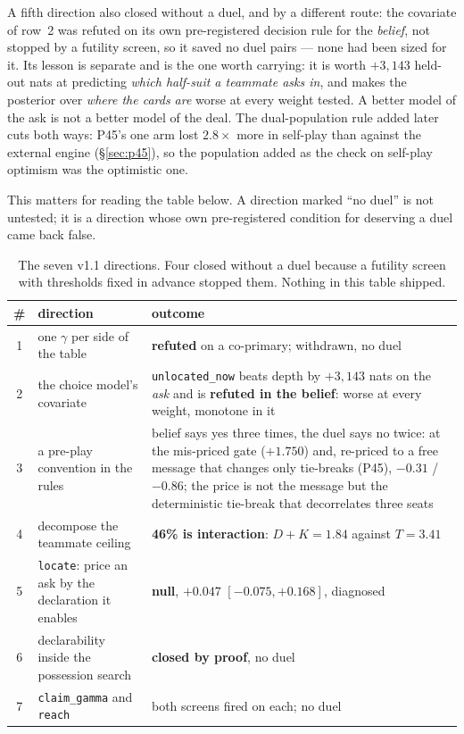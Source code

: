 \documentclass[11pt,letterpaper]{article}
\begin{document}
A fifth direction also closed without a duel, and by a different route: the
covariate of row~2 was refuted on its own pre-registered decision rule for the
\emph{belief}, not stopped by a futility screen, so it saved no duel pairs ---
none had been sized for it. Its lesson is separate and is the one worth
carrying: it is worth $+3{,}143$ held-out nats at predicting \emph{which
half-suit a teammate asks in}, and makes the posterior over \emph{where the
cards are} worse at every weight tested. A better model of the ask is not a
better model of the deal. The dual-population rule added later cuts both ways:
P45's one arm lost $2.8\times$ more in self-play than against the external engine
(\S\ref{sec:p45}), so the population added as the check on self-play optimism
was the optimistic one.

This matters for reading the table below. A direction marked ``no duel'' is not
untested; it is a direction whose own pre-registered condition for deserving a
duel came back false.

\begin{table}[htbp]
\centering\small
\begin{tabular}{@{}clp{7.2cm}@{}}
\toprule
\# & direction & outcome \\
\midrule
1 & one $\gamma$ per side of the table & \textbf{refuted} on a co-primary; withdrawn, no duel \\
2 & the choice model's covariate & \texttt{unlocated\_now} beats depth by $+3{,}143$ nats on the \emph{ask} and is \textbf{refuted in the belief}: worse at every weight, monotone in it \\
3 & a pre-play convention in the rules & belief says yes three times, the duel says no twice: at the mis-priced gate ($+1.750$) and, re-priced to a free message that changes only tie-breaks (P45), $-0.31$ / $-0.86$; the price is not the message but the deterministic tie-break that decorrelates three seats \\
4 & decompose the teammate ceiling & \textbf{46\% is interaction}: $D+K = 1.84$ against $T = 3.41$ \\
5 & \texttt{locate}: price an ask by the declaration it enables & \textbf{null}, $+0.047$ $[-0.075, +0.168]$, diagnosed \\
6 & declarability inside the possession search & \textbf{closed by proof}, no duel \\
7 & \texttt{claim\_gamma} and \texttt{reach} & both screens fired on each; no duel \\
\bottomrule
\end{tabular}
\caption{The seven v1.1 directions. Four closed without a duel because a
futility screen with thresholds fixed in advance stopped them. Nothing in this
table shipped.}
\label{tab:v11}
\end{table}
\end{document}

